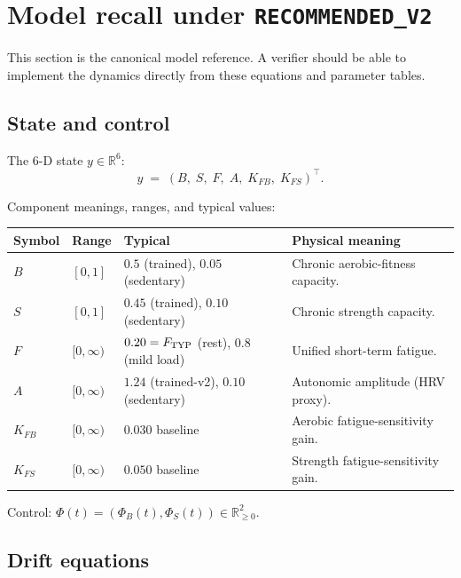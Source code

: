 \documentclass[11pt,a4paper]{article}
\theoremstyle{definition}
\newcommand{\R}{\mathbb{R}}
\begin{document}
\section{Model recall under \texttt{RECOMMENDED\_V2}} \label{sec:model-recall}

This section is the canonical model reference. A verifier should be able to implement the dynamics directly from these equations and parameter tables.

\subsection{State and control}

The 6-D state $y \in \R^6$:
\[
y \;=\; (B,\; S,\; F,\; A,\; K_{FB},\; K_{FS})^\top.
\]

Component meanings, ranges, and typical values:
\begin{center}\small
\begin{tabular}{lllp{6.3cm}}
\toprule
Symbol & Range & Typical & Physical meaning \\
\midrule
$B$       & $[0, 1]$       & $0.5$ (trained), $0.05$ (sedentary)  & Chronic aerobic-fitness capacity. \\
$S$       & $[0, 1]$       & $0.45$ (trained), $0.10$ (sedentary) & Chronic strength capacity. \\
$F$       & $[0, \infty)$  & $0.20 = F_{\rm TYP}$ (rest), $0.8$ (mild load) & Unified short-term fatigue. \\
$A$       & $[0, \infty)$  & $1.24$ (trained-v2), $0.10$ (sedentary)   & Autonomic amplitude (HRV proxy). \\
$K_{FB}$  & $[0, \infty)$  & $0.030$ baseline                           & Aerobic fatigue-sensitivity gain. \\
$K_{FS}$  & $[0, \infty)$  & $0.050$ baseline                           & Strength fatigue-sensitivity gain. \\
\bottomrule
\end{tabular}
\end{center}

Control: $\Phi(t) = (\Phi_B(t), \Phi_S(t)) \in \R_{\ge 0}^2$.

\subsection{Drift equations}
\end{document}
